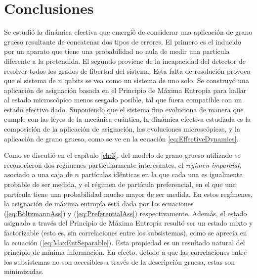 \chapter{Conclusiones}\label{sec:conclusions}



 

Se estudió la dinámica efectiva que emergió de considerar una aplicación de grano grueso resultante de concatenar dos tipos de errores. El primero es el inducido por un aparato que tiene una probabilidad no nula de medir una partícula diferente a la pretendida. El segundo proviene de la incapacidad del detector de resolver todos los grados de libertad del sistema. Esta falta de resolución provoca que el sistema de $n$ qubits se vea como un sistema de uno solo. Se construyó una aplicación de asignación basada en el Principio de Máxima Entropía para hallar al estado microscópico menos sesgado posible, tal que fuera compatible con un estado efectivo dado. Suponiendo que el sistema fino evoluciona de manera que cumple con las leyes de la mecánica cuántica, la dinámica efectiva estudiada es la composición de la aplicación de asignación, las evoluciones microscópicas, y la aplicación de grano grueso, como se ve en la ecuación \ref{eq:EffectiveDynamics}.


Como se discutió en el capítulo \ref{ch:3}, del modelo de grano grueso utilizado se reconocieron dos regímenes particularmente interesantes, el \textit{régimen imparcial}\acnote{\checkmark}, asociado a una caja de $n$ partículas idénticas en la que cada una es igualmente probable de ser medida, y el régimen de partícula preferencial, en el que una partícula tiene una probabilidad mucho mayor de ser medida. En estos regímenes, la asignación de máxima entropía está dada por las ecuaciones (\ref{eq:BoltzmannAss}) y (\ref{eq:PreferentialAss}) respectivamente.  Además, el estado asignado a través del Principio de Máxima Entropía resultó ser un estado mixto y factorizable (esto es, sin correlaciones entre los subsistemas), como se aprecia en la ecuación (\ref{eq:MaxEntSeparable}). Esta propiedad es un resultado natural del principio de mínima información. En efecto, debido a que las correlaciones entre los subsistemas no son accesibles a través de la descripción gruesa, estas son minimizadas.

